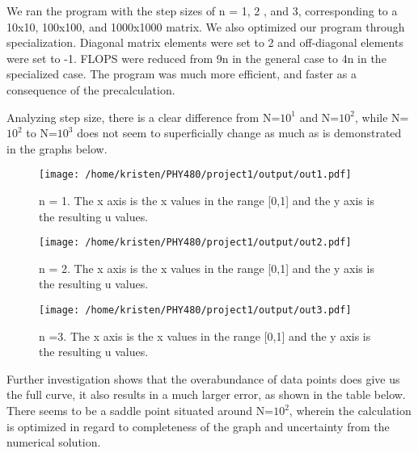 \documentclass[10pt,showpacs,preprintnumbers,footinbib,amsmath,amssymb,aps,prl,twocolumn,groupedaddress,superscriptaddress,showkeys]{revtex4-1}
\begin{document}
 We ran the program with the step sizes of n = 1, 2 , and 3, corresponding to a 10x10, 100x100, and 1000x1000 matrix. We also optimized our program through specialization. Diagonal matrix elements were set to 2 and off-diagonal elements were set to -1. FLOPS were reduced from 9n in the general case to 4n in the specialized case. The program was much more efficient, and faster as a consequence of the precalculation. 

 Analyzing step size, there is a clear difference from N=$10^{1}$ and N=$10^{2}$, while N=$10^{2}$ to N=$10^{3}$ does not seem to superficially change as much as is demonstrated in the graphs below.
 
\begin{figure}[!ht]
	\centering
	\texttt{[image: /home/kristen/PHY480/project1/output/out1.pdf]}
	\label{uvx}
	\caption{ n = 1. The x axis is the x values in the range [0,1] and the y axis is the resulting u values.}
\end{figure}

\begin{figure}[!ht]
	\centering
	\texttt{[image: /home/kristen/PHY480/project1/output/out2.pdf]}

	\label{uvx}
	\caption{n = 2. The x axis is the x values in the range [0,1] and the y axis is the resulting u values.}
\end{figure}

\begin{figure}[!ht]
	\centering
	\texttt{[image: /home/kristen/PHY480/project1/output/out3.pdf]}

	\label{uvx}
	\caption{n =3.  The x axis is the x values in the range [0,1] and the y axis is the resulting u values.}
\end{figure}

Further investigation shows that the overabundance of data points does give us the full curve, it also results in a much larger error, as shown in the table below. There seems to be a saddle point situated around N=$10^{2}$, wherein the calculation is optimized in regard to completeness of the graph and uncertainty from the numerical solution.
\end{document}
